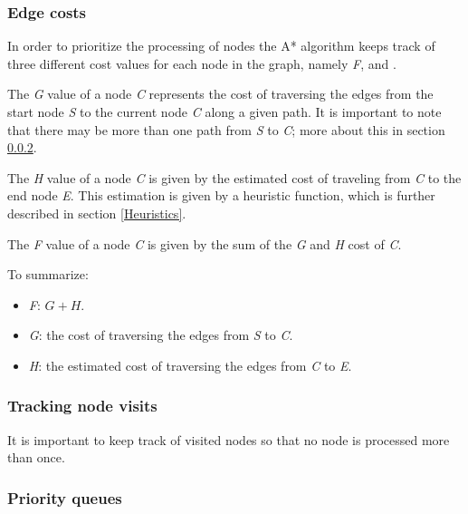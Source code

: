 \documentclass[12pt, a4paper]{article}
\begin{document}
\subsubsection{Edge costs}
\label{Edge costs}

In order to prioritize the processing of nodes the A* algorithm keeps track of
three different cost values for each node in the graph, namely \textit{F},
 and .

The \textit{G} value of a node \textit{C} represents the cost of traversing the
edges from the start node \textit{S} to the current node \textit{C} along a
given path. It is important to note that there may be more than one path from
\textit{S} to \textit{C}; more about this in section \ref{Tracking node visits}.

The \textit{H} value of a node \textit{C} is given by the estimated cost of
traveling from \textit{C} to the end node \textit{E}. This estimation is given
by a heuristic function, which is further described in section \ref{Heuristics}.

The \textit{F} value of a node \textit{C} is given by the sum of the \textit{G}
and \textit{H} cost of \textit{C}.

To summarize:
\begin{itemize}
	\item \textit{F}: $ G + H $.
	\item \textit{G}: the cost of traversing the edges from \textit{S} to
	\textit{C}.
	\item \textit{H}: the estimated cost of traversing the edges from \textit{C}
	to \textit{E}.
\end{itemize}


\subsubsection{Tracking node visits}
\label{Tracking node visits}

It is important to keep track of visited nodes so that no node is processed more
than once.



\subsubsection{Priority queues}
\label{Priority queues}
\end{document}
